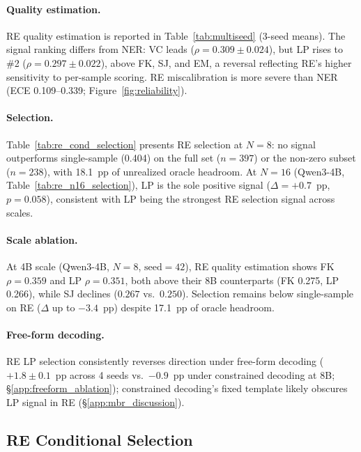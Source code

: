\paragraph{Quality estimation.}
RE quality estimation is reported in Table~\ref{tab:multiseed} (3-seed means).
The signal ranking differs from NER: VC leads ($\rho{=}0.309{\pm}0.024$), but LP rises to \#2 ($\rho{=}0.297{\pm}0.022$), above FK, SJ, and EM, a reversal reflecting RE's higher sensitivity to per-sample scoring.
RE miscalibration is more severe than NER (ECE 0.109--0.339; Figure~\ref{fig:reliability}).

\paragraph{Selection.}
Table~\ref{tab:re_cond_selection} presents RE selection at $N{=}8$: no signal outperforms single-sample (0.404) on the full set ($n{=}397$) or the non-zero subset ($n{=}238$), with 18.1~pp of unrealized oracle headroom.
At $N{=}16$ (Qwen3-4B, Table~\ref{tab:re_n16_selection}), LP is the sole positive signal ($\Delta{=}{+}0.7$~pp, $p{=}0.058$), consistent with LP being the strongest RE selection signal across scales.

\paragraph{Scale ablation.}
At 4B scale (Qwen3-4B, $N{=}8$, $\text{seed}{=}42$), RE quality estimation shows FK $\rho{=}0.359$ and LP $\rho{=}0.351$, both above their 8B counterparts (FK 0.275, LP 0.266), while SJ declines ($0.267$ vs.\ $0.250$).
Selection remains below single-sample on RE ($\Delta$ up to $-3.4$~pp) despite 17.1~pp of oracle headroom.

\paragraph{Free-form decoding.}
RE LP selection consistently reverses direction under free-form decoding ($+1.8{\pm}0.1$~pp across 4 seeds vs.\ $-0.9$~pp under constrained decoding at 8B; \S\ref{app:freeform_ablation}); constrained decoding's fixed template likely obscures LP signal in RE (\S\ref{app:mbr_discussion}).

\subsection{RE Conditional Selection}\label{app:re_conditional_selection}

